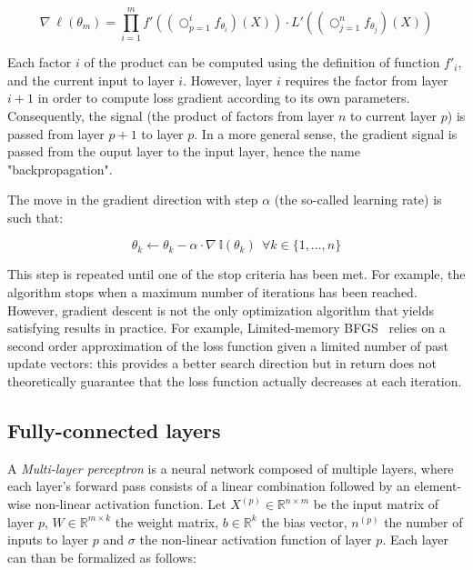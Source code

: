         \begin{equation} \label{eq:loss}
            \nabla \ \ell(\theta_m) = \prod_{i=1}^m f'((\bigcirc_{p=1}^{i} f_{\theta_i})(X)) \cdot L'((\bigcirc_{j=1}^{n} f_{\theta_j})(X))
        \end{equation}


        Each factor $i$ of the product can be computed using the definition of function $f'_i$, and the current input to layer $i$.
        However, layer $i$ requires the factor from layer $i+1$ in order to compute loss gradient according to its own parameters.
        Consequently, the signal (the product of factors from layer $n$ to current layer $p$) is passed from layer $p+1$ to layer $p$.
        In a more general sense, the gradient signal is passed from the ouput layer to the input layer, hence the name "backpropagation".

        The move in the gradient direction with step $\alpha$ (the so-called learning rate) is such that:

        \begin{equation}
            \theta_k \leftarrow \theta_k - \alpha \cdot \nabla \ \mathbb{l}(\theta_k) \  \ \forall k \in \{1, \ldots, n\}
        \end{equation}

        This step is repeated until one of the stop criteria has been met. For example, the algorithm stops when a maximum number of iterations has been
        reached. However, gradient descent is not the only optimization algorithm that yields satisfying results in practice.
        For example, Limited-memory BFGS~\cite{LBFGS} relies on a second order approximation of the loss function given a limited number of past
        update vectors: this provides a better search direction but in return does not theoretically guarantee that the loss function actually decreases at each
        iteration.

    \subsection{Fully-connected layers}

        A \textit{Multi-layer perceptron} is a neural network composed of multiple layers,
        where each layer's forward pass consists of a linear combination
        followed by an element-wise non-linear activation function.
        Let $X^{(p)} \in \mathbb{R}^{n \times m}$ be the input matrix of layer $p$,
        $W \in \mathbb{R}^{m \times k}$ the weight matrix,
        $b \in \mathbb{R}^{k}$ the bias vector, $n^{(p)}$ the number of inputs to layer $p$
        and $\sigma$ the non-linear activation function of layer $p$.
        Each layer can than be formalized as follows:

